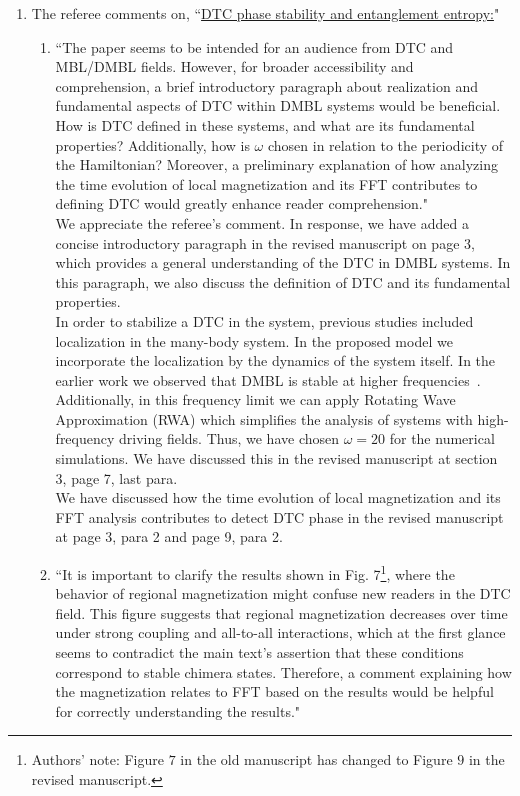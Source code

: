 \documentclass[aps,prb,reprint,showpacs,floatfix,superscriptaddress, onecolumn, nofootinbib, 10pt]{revtex4-2}
\newcommand{\response}[1]{{\color{black}#1}} %
\newcommand{\comment}[1]{{\color{blue}#1}} %
\begin{document}
\begin{enumerate}
\begin{enumerate}
		\item The referee comments on, \comment{``\underline{DTC phase stability and entanglement entropy:}"}
		\begin{enumerate}
			\item \comment{``The paper seems to be intended for an audience from DTC and MBL/DMBL fields. However, for broader accessibility and comprehension, a brief introductory paragraph about realization and fundamental aspects of DTC within DMBL
			systems would be beneficial. How is DTC defined in these systems, and what are its fundamental properties? Additionally, how is $\omega$ chosen in relation to the periodicity of the Hamiltonian? Moreover, a preliminary explanation of how analyzing the time evolution of local magnetization and its FFT contributes to defining DTC would greatly enhance reader comprehension."}\\
			
			\response{ 
			We appreciate the referee's comment. In response, we have added a concise introductory paragraph in the revised manuscript on page 3, which provides a general understanding of the DTC in DMBL systems. In this paragraph, we also discuss the definition of DTC and its fundamental properties.\\

			In order to stabilize a DTC in the system, previous studies included localization in the many-body system. In the proposed model we incorporate the localization by the dynamics of the system itself. In the earlier work we observed that DMBL is stable at higher frequencies~\cite{Mahbub2024}. Additionally, in this frequency limit we can apply Rotating Wave Approximation (RWA) which simplifies the analysis of systems with high-frequency driving fields. Thus, we have chosen $\omega=20$ for the numerical simulations. We have discussed this in the revised manuscript at section 3, page 7, last para.\\

			We have discussed how the time evolution of local magnetization and its FFT analysis contributes to detect DTC phase in the revised manuscript at page 3, para 2 and page 9, para 2.
			}\\

			\item \comment{``It is important to clarify the results shown in Fig. 7\footnote{Authors' note: Figure $7$ in the old manuscript has changed to Figure $9$ in the revised manuscript.}, where the behavior of regional magnetization might confuse new readers in the DTC field. This figure suggests that regional magnetization decreases over time under strong coupling and all-to-all interactions, which at the first glance seems to contradict the main text’s assertion that these conditions correspond to stable chimera states. Therefore, a comment  explaining how the magnetization relates to FFT based on the results would be helpful for correctly understanding the results."}\\
			

\end{enumerate}
\end{enumerate}
\end{enumerate}
\end{document}
